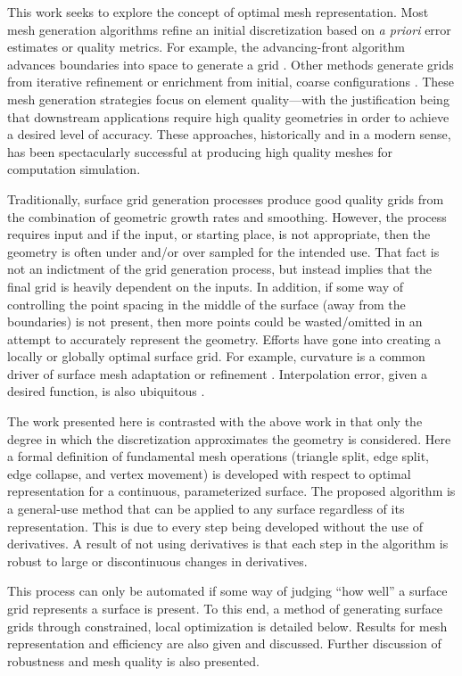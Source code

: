This work seeks to explore the concept of optimal mesh representation.
Most mesh generation algorithms refine an initial discretization based
on {\it a priori} error estimates or quality metrics. For example, the
advancing-front algorithm advances boundaries into space to generate a
grid \cite{tristrano98, diaz-morcillo98}. Other methods generate
grids from iterative refinement or enrichment from initial, coarse
configurations \cite{marcum98, marcum00, shewchuk02}. These mesh
generation strategies focus on element quality---with the
justification being that downstream applications require high quality
geometries in order to achieve a desired level of accuracy. These
approaches, historically and in a modern sense, has been spectacularly
successful at producing high quality meshes for computation simulation.

Traditionally, surface grid generation processes produce good quality
grids from the combination of geometric growth rates and smoothing.
However, the process requires input and if the input, or starting place,
is not appropriate, then the geometry is often under and/or over sampled
for the intended use. That fact is not an indictment of the grid
generation process, but instead implies that the final grid is heavily
dependent on the inputs. In addition, if some way of controlling the
point spacing in the middle of the surface (away from the boundaries) is
not present, then more points could be wasted/omitted in an attempt to
accurately represent the geometry. Efforts have gone into
creating a locally or globally optimal surface grid. For example,
curvature is a common driver of surface mesh adaptation or refinement
\cite{siqueria13}. Interpolation error, given a desired function, 
is also ubiquitous \cite{peraire87, alauzet06, buscaglia97, huang05}.

The work presented here is contrasted with the above work in that only
the degree in which the discretization approximates the geometry is
considered.  Here a formal definition of fundamental mesh operations
(triangle split, edge split, edge collapse, and vertex movement) is
developed with respect to optimal representation for a continuous,
parameterized surface. The proposed algorithm is a general-use method
that can be applied to any surface regardless of its representation.
This is due to every step being developed without the use of
derivatives. A result of not using derivatives is that each step in the
algorithm is robust to large or discontinuous changes in derivatives.

This process can only be automated if some way of judging ``how well'' a
surface grid represents a surface is present. To this end, a method of
generating surface grids through constrained, local optimization is
detailed below. Results for mesh representation and efficiency are also
given and discussed.  Further discussion of robustness and mesh quality
is also presented.

